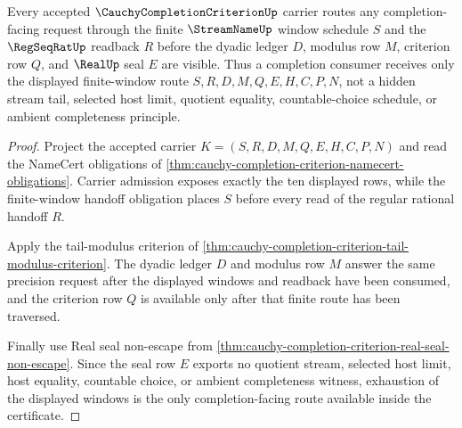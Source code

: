 \begin{theorem}
\label{thm:cauchy-completion-criterion-window-exhaustion}
Every accepted $\CauchyCompletionCriterionUp$ carrier routes any completion-facing request through the finite $\StreamNameUp$ window schedule $S$ and the $\RegSeqRatUp$ readback $R$ before the dyadic ledger $D$, modulus row $M$, criterion row $Q$, and $\RealUp$ seal $E$ are visible. Thus a completion consumer receives only the displayed finite-window route $S,R,D,M,Q,E,H,C,P,N$, not a hidden stream tail, selected host limit, quotient equality, countable-choice schedule, or ambient completeness principle.
\end{theorem}
\begin{proof}
Project the accepted carrier $K=(S,R,D,M,Q,E,H,C,P,N)$ and read the NameCert obligations of \autoref{thm:cauchy-completion-criterion-namecert-obligations}. Carrier admission exposes exactly the ten displayed rows, while the finite-window handoff obligation places $S$ before every read of the regular rational handoff $R$.

Apply the tail-modulus criterion of \autoref{thm:cauchy-completion-criterion-tail-modulus-criterion}. The dyadic ledger $D$ and modulus row $M$ answer the same precision request after the displayed windows and readback have been consumed, and the criterion row $Q$ is available only after that finite route has been traversed.

Finally use Real seal non-escape from \autoref{thm:cauchy-completion-criterion-real-seal-non-escape}. Since the seal row $E$ exports no quotient stream, selected host limit, host equality, countable choice, or ambient completeness witness, exhaustion of the displayed windows is the only completion-facing route available inside the certificate.
\end{proof}

